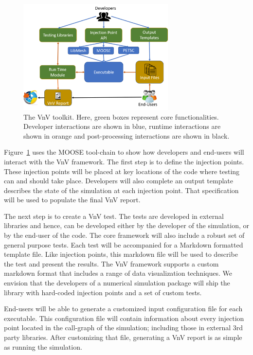 \begin{figure}
\centering
 \includegraphics[width=0.7\textwidth]{./narrative/figures/VnVOut.png}
 \caption{ The VnV toolkit. Here, green boxes represent core functionalities. Developer interactions are shown in blue, runtime interactions are shown in orange and post-processing interactions are shown in black. \label{fig:toolchain} } 
\end{figure}
 
Figure~\ref{fig:toolchain} uses the MOOSE tool-chain to show how developers and end-users will interact with the VnV framework. The first step is to define the injection points. These injection points will be placed at key locations of the code where testing can and should take place. Developers will also complete an output template describes the state of the simulation at each injection point. That specification will be used to populate the final VnV report. 

The next step is to create a VnV test. The tests are developed in external libraries and hence, can be developed either by the developer of the simulation, or by the end-user of the code. The core framework will also include a robust set of general purpose \VV tests. Each test will be accompanied for a Markdown formatted template file. Like injection points, this markdown file will be used to
describe the test and present the results. The VnV framework supports a custom markdown format that includes a range of data visualization techniques. We envision that the developers of a numerical simulation package will ship the library with hard-coded injection points and a set of custom \VV tests. 

End-users will be able to generate a customized input configuration file for each executable. This configuration file will contain information about every injection point located in the call-graph of the simulation; including those in external 3rd party libraries. After customizing that file, generating a VnV report is as simple as running the simulation.
 
